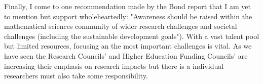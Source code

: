 \documentclass[11pt]{article} %
\begin{document}
Finally, I come to one recommendation made by the Bond report \cite{Bond} that I am yet to mention but support wholeheartedly: "Awareness should be raised within the mathematical sciences community of wider research challenges and societal challenges (including the sustainable development goals"). With a vast talent pool but limited resources, focusing an the most important challenges is vital. As we have seen the Research Councils' and Higher Education Funding Councils' are increasing their emphasis on research impacts but there is a individual researchers must also take some responsibility.
 
\pagebreak	
	
	
\end{document}
